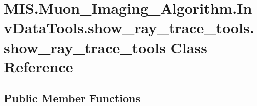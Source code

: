 \hypertarget{classMIS_1_1Muon__Imaging__Algorithm_1_1InvDataTools_1_1show__ray__trace__tools_1_1show__ray__trace__tools}{}\section{M\+I\+S.\+Muon\+\_\+\+Imaging\+\_\+\+Algorithm.\+Inv\+Data\+Tools.\+show\+\_\+ray\+\_\+trace\+\_\+tools.\+show\+\_\+ray\+\_\+trace\+\_\+tools Class Reference}
\label{classMIS_1_1Muon__Imaging__Algorithm_1_1InvDataTools_1_1show__ray__trace__tools_1_1show__ray__trace__tools}
\subsection*{Public Member Functions}
